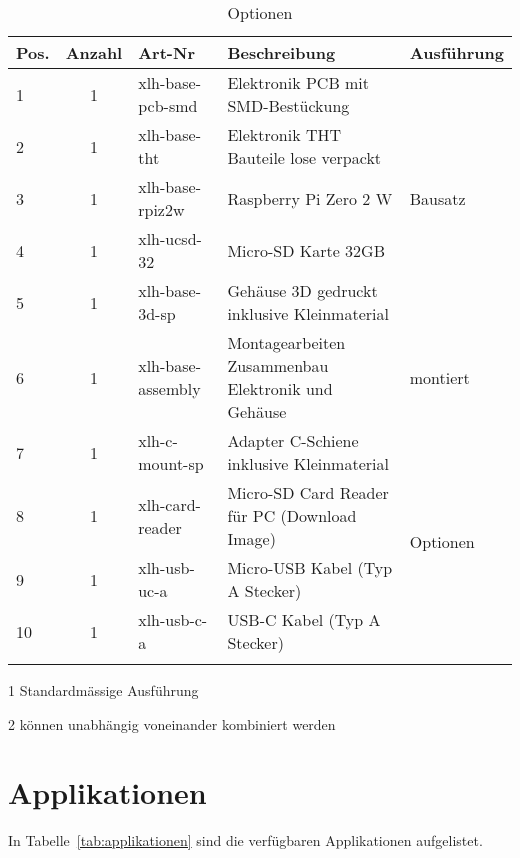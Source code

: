 \begin{table}[h]
\begin{threeparttable}
\caption{Optionen \lernplattformname}
    \begin{tabularx}{\textwidth}{l | c | l | l | X}

        \thickhline
        \textbf{Pos.} & \textbf{Anzahl} & \textbf{Art-Nr} & \textbf{Beschreibung} & \textbf{Ausführung} \\
        \hline
        1 & 1 & xlh-base-pcb-smd & Elektronik PCB mit SMD-Bestückung & \multirow{5}{*}{Bausatz\tnote{1}}  \\
        2 & 1 & xlh-base-tht & Elektronik THT Bauteile lose verpackt &  \\
        3 & 1 & xlh-base-rpiz2w & Raspberry Pi Zero 2 W & \\
        4 & 1 & xlh-ucsd-32 & Micro-SD Karte 32GB & \\
        5 & 1 & xlh-base-3d-sp & Gehäuse 3D gedruckt inklusive Kleinmaterial & \\
        \hline
        6 & 1 & xlh-base-assembly & Montagearbeiten Zusammenbau Elektronik und Gehäuse & montiert \\
        \hline
        7 & 1 & xlh-c-mount-sp & Adapter C-Schiene inklusive Kleinmaterial & \multirow{4}{*}{Optionen\tnote{2}} \\
        8 & 1 & xlh-card-reader & Micro-SD Card Reader für PC (Download Image) &  \\
        9 & 1 & xlh-usb-uc-a & Micro-USB Kabel (Typ A Stecker) &  \\
        10 & 1 & xlh-usb-c-a & USB-C Kabel (Typ A Stecker) &  \\
        \thickhline
    \end{tabularx}
\begin{tablenotes}
\item[1]{Standardmässige Ausführung}
\item[2]{können unabhängig voneinander kombiniert werden}
\end{tablenotes}
\label{tab:optionen}
\end{threeparttable}
\end{table}


\section{Applikationen}
In Tabelle~\ref{tab:applikationen} sind die verfügbaren Applikationen aufgelistet.

